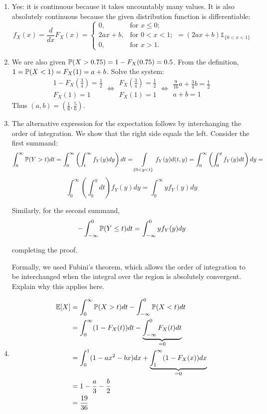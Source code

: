 \documentclass[a4paper]{report}
\begin{document}
\begin{solution}
    \begin{enumerate}
        \item Yes: it is continuous because it takes uncountably many values. It is also absolutely continuous because the given distribution function is differentiable:
            \[f_X(x) = \frac{d}{dx}F_X(x) = \begin{cases}
            0, & \text{for }x\leq0;\\
            2ax+b, & \text{for }0<x<1;\\
            0, & \text{for }x>1.
            \end{cases} = (2ax + b)\mathbb{1}_{\{0<x<1\}}\]

        \item We are also given $\P(X>0.75)=1-F_X(0.75)=0.5$. From the definition, $1=\P(X<1)=F_X(1)=a+b$. Solve the system:
        \[
        \begin{array}{|l} 1-F_X\left(\frac{3}{4}\right) = \frac{1}{2} \\ F_X(1) = 1\end{array} \Leftrightarrow
        \begin{array}{|l} F_X\left(\frac{3}{4}\right) = \frac{1}{2} \\ F_X(1) = 1\end{array} \Leftrightarrow
        \begin{array}{|l} \frac{9}{16}a + \frac{3}{4}b = \frac{1}{2} \\ a+b = 1\end{array}\]
        Thus $(a,b)=\left(\frac16,\frac56\right)$.

        \item The alternative expression for the expectation follows by interchanging the order of integration. We show that the right side equals the left. Consider the first summand:
        \[\int_0^\infty\P(Y>t)dt = \int_0^\infty\left(\int_t^\infty f_Y(y)dy\right)dt = \int\limits_{\{0 < y < t\}}f_Y(y)d(t, y) = \int_0^\infty\left(\int_0^yf_Y(y)dt\right)dy =\]
        \[\int_0^\infty\left(\int_0^ydt\right)f_Y(y)dy = \int_0^\infty yf_Y(y)dy\]

        Similarly, for the second summand,
        \[-\int_{-\infty}^0\P(Y\le t)dt = \int_{-\infty}^0yf_Y(y)dy\]

        completing the proof.

        Formally, we used Fubini's theorem, which allows the order of integration to be interchanged when the integral over the region is absolutely convergent. Explain why this applies here.
        \item
        \begin{align*}
            \E[X]
            &= \int_0^\infty\P(X>t)dt - \int_{-\infty}^0\P(X < t)dt \\
            &= \int_0^\infty(1-F_X(t))dt - \underbrace{\int_{-\infty}^0F_X(t)dt}_{=0} \\
            &= \int_0^1(1-ax^2-bx)dx + \underbrace{\int_1^\infty(1-F_X(x))dx}_{=0} \\
            &= 1 - \frac{a}{3} - \frac{b}{2} \\
            &= \frac{19}{36}
        \end{align*}


\end{enumerate}
\end{solution}
\end{document}

